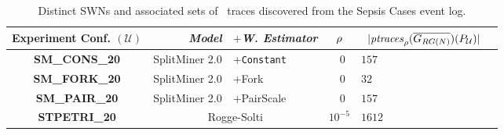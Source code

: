 \begin{table}[!t]
\caption{Distinct SWNs and associated sets of \unravelled\ traces discovered from the Sepsis Cases event log.}\label{tab:dataset}
\centering
 \begin{adjustbox}{width=.6\textwidth}
	\begin{tabular}{crl||cl|c}
		\toprule
		\textbf{Experiment Conf.} $(\mathcal{U})$ & \textit{Model} & $+$\textit{W. Estimator} & $\pmin$& $\;\;|\WCal{\pmin}{n}(P_{\mathcal{U}})|$ \\
		\midrule
		
		\textbf{SM\_CONS\_20} &SplitMiner 2.0  \cite{AugustoCDRP19}       & +\texttt{Constant} &  $\;\;0$ & $157$  \\
		
		\textbf{SM\_FORK\_20} & SplitMiner 2.0  \cite{AugustoCDRP19}      & +Fork \cite{spdwe} &  $\;\;0$ & $32$  \\
		
		
		\textbf{SM\_PAIR\_20} & SplitMiner 2.0  \cite{AugustoCDRP19}      & +PairScale \cite{spdwe} &  $\;\;0$ & $157$ \\

		\textbf{STPETRI\_20} & \multicolumn{2}{c||}{Rogge-Solti \cite{RoggeSoltiAW13}} &  $10^{-5}$ & $1612$ \\
		\bottomrule
	\end{tabular}
\end{adjustbox}
\end{table}


